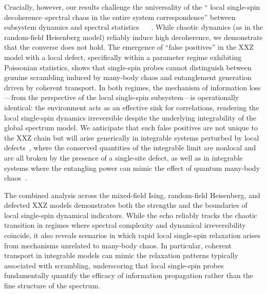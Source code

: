 \documentclass[pra,twocolumn,aps,showpacs,superscriptaddress,longbibliography]{revtex4-2}%
\providecommand{\DIFadd}[1]{{\protect\color{blue} \sf #1}} %
\providecommand{\DIFdel}[1]{{\protect\color{red} \scriptsize #1}} %
\providecommand{\DIFaddbegin}{} %
\providecommand{\DIFaddend}{} %
\providecommand{\DIFdelbegin}{} %
\providecommand{\DIFdelend}{} %
\begin{document}
Crucially, however, our results challenge the universality of the ``\DIFdelbegin \DIFdel{local }\DIFdelend \DIFaddbegin \DIFadd{single-spin }\DIFaddend decoherence--spectral chaos in the entire system correspondence'' between subsystem dynamics and spectral statistics\DIFaddbegin \DIFadd{~\mbox{%
\cite{mirkin_2021_quantum}}\hskip0pt%
}\DIFaddend . While chaotic dynamics (as in the random-field Heisenberg model) reliably induce high decoherence, we demonstrate that the converse does not hold. The emergence of ``false positives'' in the XXZ model with a local defect, specifically within a parameter regime exhibiting Poissonian statistics, shows that single-spin probes cannot distinguish between genuine scrambling induced by many-body chaos and entanglement generation driven by coherent transport. In both regimes, the mechanism of information loss---from the perspective of the \DIFdelbegin \DIFdel{local }\DIFdelend \DIFaddbegin \DIFadd{single-spin }\DIFaddend subsystem---is operationally identical: the environment acts as an effective sink for correlations, rendering the \DIFdelbegin \DIFdel{local }\DIFdelend \DIFaddbegin \DIFadd{single-spin }\DIFaddend dynamics irreversible despite the underlying integrability of the \DIFdelbegin \DIFdel{global spectrum}\DIFdelend \DIFaddbegin \DIFadd{model}\DIFaddend . We anticipate that such false positives are not unique to the XXZ chain but will arise generically in integrable systems perturbed by local defects~\cite{santos_2020_speck}, where the conserved quantities of the integrable limit are nonlocal and are all broken by the presence of a single-site defect, as well as in integrable systems where the entangling power can mimic the effect of quantum many-body chaos~\cite{betheanzatsmagic2025}.

The combined analysis across the mixed-field Ising, random-field Heisenberg, and defected XXZ models demonstrates both the strengths and the boundaries of \DIFdelbegin \DIFdel{local }\DIFdelend \DIFaddbegin \DIFadd{single-spin }\DIFaddend dynamical indicators. While the echo reliably tracks the chaotic transition in regimes where spectral complexity and dynamical irreversibility coincide, it also reveals scenarios in which rapid \DIFdelbegin \DIFdel{local }\DIFdelend \DIFaddbegin \DIFadd{single-spin }\DIFaddend relaxation arises from mechanisms unrelated to many-body chaos. In particular, coherent transport in integrable models can mimic the relaxation patterns typically associated with scrambling, underscoring that \DIFdelbegin \DIFdel{local }\DIFdelend \DIFaddbegin \DIFadd{single-spin }\DIFaddend probes fundamentally quantify the efficacy of information propagation rather than the fine structure of the spectrum.
\DIFdelbegin %
\end{document}
